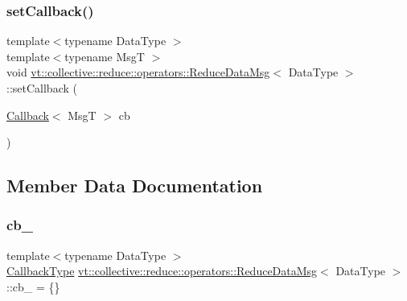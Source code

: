 \mbox{\label{structvt_1_1collective_1_1reduce_1_1operators_1_1_reduce_data_msg_afc3de5443774bc3838c9ccca05054210}} 
\subsubsection{\texorpdfstring{set\+Callback()}{setCallback()}}
{\footnotesize\ttfamily template$<$typename Data\+Type $>$ \\
template$<$typename MsgT $>$ \\
void \hyperlink{structvt_1_1collective_1_1reduce_1_1operators_1_1_reduce_data_msg}{vt\+::collective\+::reduce\+::operators\+::\+Reduce\+Data\+Msg}$<$ Data\+Type $>$\+::set\+Callback (\begin{DoxyParamCaption}\item[{\hyperlink{namespacevt_a36db99df4c973d48b1118a293fff533f}{Callback}$<$ MsgT $>$}]{cb }\end{DoxyParamCaption})\hspace{0.3cm}{\ttfamily [inline]}}



\subsection{Member Data Documentation}
\mbox{\label{structvt_1_1collective_1_1reduce_1_1operators_1_1_reduce_data_msg_a89c7b9270ac15672f38c7256abe3c044}} 
\subsubsection{\texorpdfstring{cb\+\_\+}{cb\_}}
{\footnotesize\ttfamily template$<$typename Data\+Type $>$ \\
\hyperlink{structvt_1_1collective_1_1reduce_1_1operators_1_1_reduce_data_msg_a299d0d7f62e0e631ef344e345d89a4f3}{Callback\+Type} \hyperlink{structvt_1_1collective_1_1reduce_1_1operators_1_1_reduce_data_msg}{vt\+::collective\+::reduce\+::operators\+::\+Reduce\+Data\+Msg}$<$ Data\+Type $>$\+::cb\+\_\+ = \{\}\hspace{0.3cm}{\ttfamily [protected]}}

